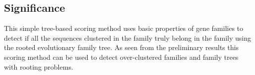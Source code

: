 \documentclass{article}
\begin{document}
		\begin{figure}[h!]
			\caption{}
			\label{fig:hist_tree_precision_scores_lgf5}
		\end{figure}
		
		\begin{figure}[h!]
			\caption{}
			\label{fig:scatter_tree_precision_vs_seqct_lgf5}
		\end{figure}
		
		\subsection{Significance}
		This simple tree-based scoring method uses basic properties of gene families to detect if all the sequences clustered in the family truly belong in the family using the rooted evolutionary family tree. As seen from the preliminary results this scoring method can be used to detect over-clustered families and family trees with rooting problems.
		
\end{document}
